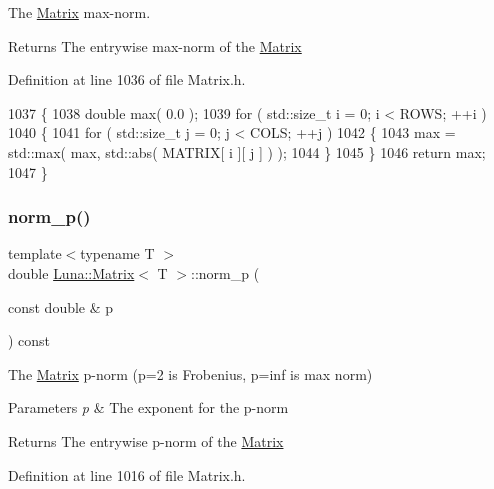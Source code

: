 The \hyperlink{classLuna_1_1Matrix}{Matrix} max-\/norm. 

\begin{DoxyReturn}{Returns}
The entrywise max-\/norm of the \hyperlink{classLuna_1_1Matrix}{Matrix} 
\end{DoxyReturn}


Definition at line 1036 of file Matrix.\+h.


\begin{DoxyCode}
1037   \{
1038     \textcolor{keywordtype}{double} max( 0.0 );
1039     \textcolor{keywordflow}{for} ( std::size\_t i = 0; i < ROWS; ++i )
1040     \{
1041         \textcolor{keywordflow}{for} ( std::size\_t j = 0; j < COLS; ++j )
1042         \{
1043             max = std::max( max, std::abs( MATRIX[ i ][ j ] ) );
1044         \}
1045     \}
1046     \textcolor{keywordflow}{return} max;
1047   \}
\end{DoxyCode}
\mbox{\label{classLuna_1_1Matrix_a95e7a5a0afb0abb419c4cfb8e1c27b57}} 
\subsubsection{\texorpdfstring{norm\+\_\+p()}{norm\_p()}}
{\footnotesize\ttfamily template$<$typename T $>$ \\
double \hyperlink{classLuna_1_1Matrix}{Luna\+::\+Matrix}$<$ T $>$\+::norm\+\_\+p (\begin{DoxyParamCaption}\item[{const double \&}]{p }\end{DoxyParamCaption}) const\hspace{0.3cm}{\ttfamily [inline]}}



The \hyperlink{classLuna_1_1Matrix}{Matrix} p-\/norm (p=2 is Frobenius, p=inf is max norm) 


\begin{DoxyParams}{Parameters}
{\em p} & The exponent for the p-\/norm \\
\hline
\end{DoxyParams}
\begin{DoxyReturn}{Returns}
The entrywise p-\/norm of the \hyperlink{classLuna_1_1Matrix}{Matrix} 
\end{DoxyReturn}


Definition at line 1016 of file Matrix.\+h.


